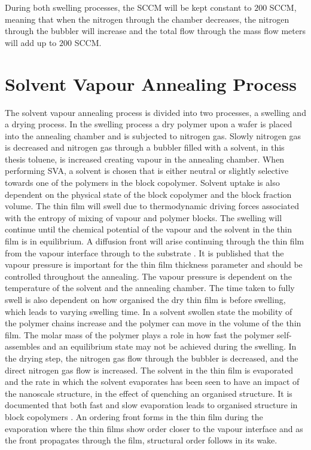 \documentclass[MasterThesisMain.tex]{subfiles}
\begin{document}
During both swelling processes, the SCCM will be kept constant to $200$ SCCM, meaning that when the nitrogen through the chamber decreases, the nitrogen through the bubbler will increase and the total flow through the mass flow meters will add up to $200$ SCCM.


\section{Solvent Vapour Annealing Process}
The solvent vapour annealing process is divided into two processes, a swelling and a drying process. In the swelling process a dry polymer upon a wafer is placed into the annealing chamber and is subjected to nitrogen gas. Slowly nitrogen gas is decreased and nitrogen gas through a bubbler filled with a solvent, in this thesis toluene, is increased creating vapour in the annealing chamber. When performing SVA, a solvent is chosen that is either neutral or slightly selective towards one of the polymers in the block copolymer. Solvent uptake is also dependent on the physical state of the block copolymer and the block fraction volume. The thin film will swell due to thermodynamic driving forces associated with the entropy of mixing of vapour and polymer blocks. The swelling will continue until the chemical potential of the vapour and the solvent in the thin film is in equilibrium. A diffusion front will arise continuing through the thin film from the vapour interface through to the substrate \cite{SVABCP}. It is published that the vapour pressure is important for the thin film thickness parameter and should be controlled throughout the annealing. The vapour pressure is dependent on the temperature of the solvent and the annealing chamber. The time taken to fully swell is also dependent on how organised the dry thin film is before swelling, which leads to varying swelling time. In a solvent swollen state the mobility of the polymer chains increase and the polymer can move in the volume of the thin film. The molar mass of the polymer plays a role in how fast the polymer self-assembles and an equilibrium state may not be achieved during the swelling. In the drying step, the nitrogen gas flow through the bubbler is decreased, and the direct nitrogen gas flow is increased. The solvent in the thin film is evaporated and the rate in which the solvent evaporates has been seen to have an impact of the nanoscale structure, in the effect of quenching an organised structure. It is documented that both fast and slow evaporation leads to organised structure in block copolymers \cite{SVABCP}. An ordering front forms in the thin film during the evaporation where the thin films show order closer to the vapour interface and as the front propagates through the film, structural order follows in its wake\cite{SVABCP}. 
\end{document}
